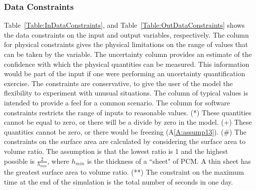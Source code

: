 \documentclass[12pt]{article}
\begin{document}
\subsubsection{Data Constraints}
\label{Sec:DataConstraints}
Table~\ref{Table:InDataConstraints}, and Table~\ref{Table:OutDataConstraints} shows the data constraints on the input and output variables, respectively. The column for physical constraints gives the physical limitations on the range of values that can be taken by the variable. The uncertainty column provides an estimate of the confidence with which the physical quantities can be measured. This information would be part of the input if one were performing an uncertainty quantification exercise. The constraints are conservative, to give the user of the model the flexibility to experiment with unusual situations. The column of typical values is intended to provide a feel for a common scenario. The column for software constraints restricts the range of inputs to reasonable values. (*) These quantities cannot be equal to zero, or there will be a divide by zero in the model. (+) These quantities cannot be zero, or there would be freezing (A\ref{A:assump13}). (\#) The constraints on the surface area are calculated by considering the surface area to volume ratio. The assumption is that the lowest ratio is 1 and the highest possible is $\frac{2}{{h_{min}}}$, where ${h_{min}}$ is the thickness of a ``sheet" of PCM. A thin sheet has the greatest surface area to volume ratio. (**) The constraint on the maximum time at the end of the simulation is the total number of seconds in one day.
\end{document}
